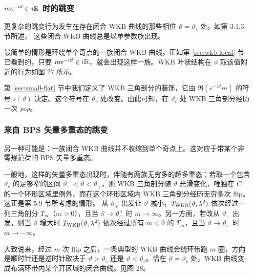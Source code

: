\subsubsection{$m e^{-i\vartheta} \in i\mathbb{R}$ 时的跳变} \label{sec:flavor-jump}

更复杂的跳变行为发生在存在闭合 WKB 曲线的那些相位 $\vartheta = \vartheta_c$ 处。如第 3.1.3 节所述，%
这些闭合 WKB 曲线总是以单参数族出现。

最简单的情形是环绕单个奇点的一族闭合 WKB 曲线。正如第 \ref{sec:wkb-local} 节已看到的，只要 $m e^{-i\vartheta} \in i\mathbb{R}$，就会出现这样一族。WKB 叶状结构在 $\vartheta$ 取该值附近的行为如图 27 所示。%


第 \ref{sec:small-flat} 节中我们定义了 WKB 三角剖分的装饰，它由 $\Re (e^{-i\vartheta} m)$ 的符号 $\varepsilon(\vartheta)$ 决定。这个符号在 $\vartheta_c$ 处改变。由此可知，在 $\vartheta_c$ 处 WKB 三角剖分经历一次 \emph{pop}。

\subsubsection{来自 BPS 矢量多重态的跳变} \label{sec:vector-jump}

另一种可能是：一族闭合 WKB 曲线并不收缩到单个奇点上。这对应于带某个非零规范荷的 BPS 矢量多重态。

一般地，这样的矢量多重态出现时，伴随有两族无穷多的超多重态：若取一个包含 $\vartheta_c$ 的足够窄的区间 $\vartheta_- < \vartheta < \vartheta_+$，则 WKB 三角剖分随 $\vartheta$ 光滑变化，唯独在 $C$ 的一个环形区域里例外，而在这个环形区域内 WKB 三角剖分经历无穷多次 flip。这正是第 5.9 节所考虑的情形。%
从 $\vartheta_+$ 出发让 $\vartheta$ 减小，$T_{\rm WKB}(\vartheta, \lambda^2)$ 依次经过一列三角剖分 $T_m$（$m>0$），且当 $\vartheta \to \vartheta_c^+$ 时 $m \to \infty$。另一方面，若改从 $\vartheta_-$ 出发，则当 $\vartheta$ 增大时 $T_{\rm WKB}(\vartheta, \lambda^2)$ 依次经过所有 $m<0$ 的 $T_m$，且当 $\vartheta \to \vartheta_c^-$ 时 $m \to -\infty$。


大致说来，经过 $m$ 次 flip 之后，一条典型的 WKB 曲线会绕环带跑 $m$ 圈，方向是顺时针还是逆时针取决于 $\vartheta > \vartheta_c$ 还是 $\vartheta < \vartheta_c$。恰在 $\vartheta = \vartheta_c$ 处，WKB 曲线变成布满环带内某个开区域的闭合曲线。见图 28。%


